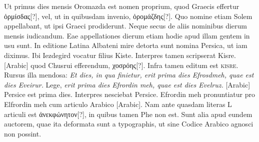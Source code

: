 Ut primus dies mensis
Oromazda est nomen proprium, quod Graecis effertur \textgreek{ὀρμίσδας}[?], vel,
ut in quibusdam invenio, \textgreek{ὀρομάζδης}[?].
Quo nomine etiam Solem appellabant,
ut ipsi Graeci prodiderunt.
Neque secus de aliis nominibus
dierum mensis iudicandum.
Eae appellationes dierum etiam
hodie apud illam gentem in usu sunt.
In editione Latina Albateni
mire detorta sunt nomina Persica, ut iam diximus.
Ibi Iezdegird
vocatur filius Kiste.
Interpres tamen scripserat Kisre. %
\textarabic{}[Arabic] quod
Chusrui efferendum, \textgreek{χοσρόης}[?].
Infra tamen editum est \textsc{kisre}.
Rursus
illa mendosa: \emph{Et dies, in qua finietur, erit prima dies Efrosdmeh, quae
est dies Eveirur.}
Lege, \emph{erit prima dies Efrordin meh, quae est dies Evelruz.}
\textarabic{}[Arabic] Persice est prima dies.
Interpres nesciebat Persice.
Efrordin
meh pronuntiatur pro Elfrordin meh cum articulo Arabico
\textarabic{}[Arabic]. %
Nam ante quasdam literas L articuli est \textgreek{ἀνεκφώνητον}[?],
in quibus tamen Phe non est.
Sunt alia apud eundem auctorem, quae
ita deformata sunt a typographis, ut sine Codice Arabico agnosci
non possint.
%
